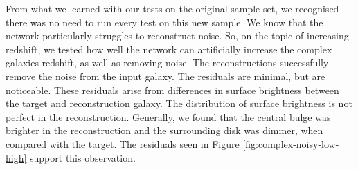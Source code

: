 \documentclass[fleqn,usenatbib]{mnras}
\begin{document}
From what we learned with our tests on the original sample set, we recognised there was no need to run every test on this new sample. We know that the network particularly struggles to reconstruct noise. So, on the topic of increasing redshift, we tested how well the network can artificially increase the complex galaxies redshift, as well as removing noise. The reconstructions successfully remove the noise from the input galaxy. The residuals are minimal, but are noticeable. These residuals arise from differences in surface brightness between the target and reconstruction galaxy. The distribution of surface brightness is not perfect in the reconstruction. Generally, we found that the central bulge was brighter in the reconstruction and the surrounding disk was dimmer, when compared with the target. The residuals seen in Figure \ref{fig:complex-noisy-low-high} support this observation.
\end{document}
